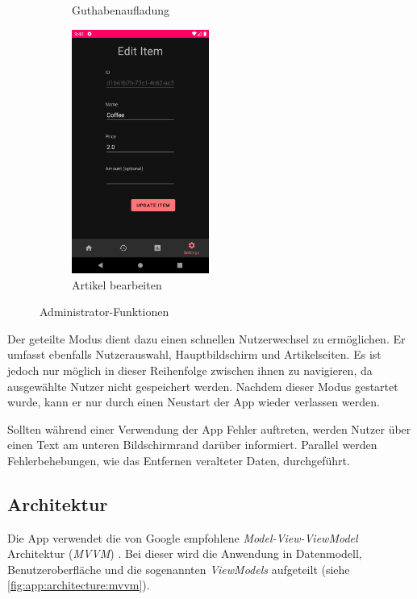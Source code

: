 \documentclass[a4paper, 11pt]{article}
\begin{document}
\begin{figure}[]
\begin{subfigure}{.5\textwidth}
		\caption{Guthabenaufladung}
		\label{fig:app:architecture:functionality:admin:crediting}
	\end{subfigure}
	\begin{subfigure}{.5\textwidth}
		\centering
		\includegraphics[height=8cm,keepaspectratio]{./images/screenshots/edit-item.png}
		\caption{Artikel bearbeiten}
		\label{fig:app:architecture:functionality:admin:edit}
	\end{subfigure}
	\caption{Administrator-Funktionen}
	\label{fig:app:architecture:functionality:admin}
\end{figure}

Der geteilte Modus dient dazu einen schnellen Nutzerwechsel zu ermöglichen.
Er umfasst ebenfalls Nutzerauswahl, Hauptbildschirm und Artikelseiten.
Es ist jedoch nur möglich in dieser Reihenfolge zwischen ihnen zu navigieren, da ausgewählte Nutzer nicht gespeichert werden.
Nachdem dieser Modus gestartet wurde, kann er nur durch einen Neustart der App wieder verlassen werden.

Sollten während einer Verwendung der App Fehler auftreten, werden Nutzer über einen Text am unteren Bildschirmrand darüber informiert.
Parallel werden Fehlerbehebungen, wie das Entfernen veralteter Daten, durchgeführt.

\subsection{Architektur}
\label{subsec:app:architecture}
Die App verwendet die von Google empfohlene \textit{Model-View-ViewModel} Architektur (\textit{MVVM}) \autocite{androidarchitecture}.
Bei dieser wird die Anwendung in Datenmodell, Benutzeroberfläche und die sogenannten \textit{ViewModels} aufgeteilt (siehe \autoref{fig:app:architecture:mvvm}).
\end{document}
